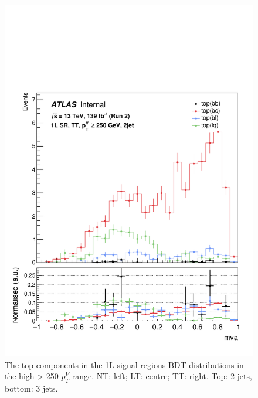 \begin{figure}[h!]
\includegraphics[scale=0.253]{Images/VH/top/OneLepton_top_2tttag2jet_SR_250ptv_mva.pdf}
\caption{The top components in the 1L signal regions BDT distributions in the high > 250 $p_T^V$ range. NT: left; LT: centre; TT: right. Top: 2 jets, bottom: 3 jets.} 
\label{fig:topSRshighptv}
\end{figure}

